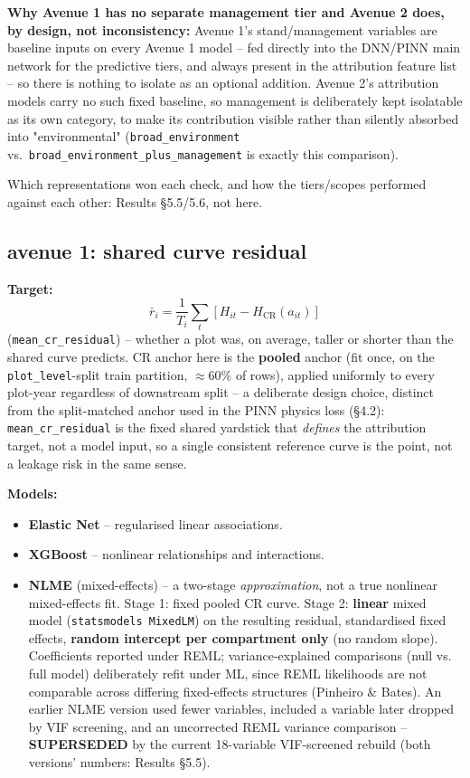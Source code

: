 \textbf{Why Avenue 1 has no separate management tier and Avenue 2 does, by design, not
inconsistency:} Avenue 1's stand/management variables are baseline inputs on every Avenue 1
model -- fed directly into the DNN/PINN main network for the predictive tiers, and always present
in the attribution feature list -- so there is nothing to isolate as an optional addition.
Avenue 2's attribution models carry no such fixed baseline, so management is deliberately kept
isolatable as its own category, to make its contribution visible rather than silently absorbed
into "environmental" (\texttt{broad\_environment} vs.\ \texttt{broad\_environment\_plus\_management}
is exactly this comparison).

Which representations won each check, and how the tiers/scopes performed against each other:
Results \S5.5/5.6, not here.

\subsection{avenue 1: shared curve residual}

\textbf{Target:}
\[
\bar r_i = \frac{1}{T_i}\sum_t \left[H_{it} - H_{\text{CR}}(a_{it})\right]
\]
(\texttt{mean\_cr\_residual}) -- whether a plot was, on average, taller or shorter than the shared
curve predicts. CR anchor here is the \textbf{pooled} anchor (fit once, on the
\texttt{plot\_level}-split train partition, $\approx$60\% of rows), applied uniformly to every
plot-year regardless of downstream split -- a deliberate design choice, distinct from the
split-matched anchor used in the PINN physics loss (\S4.2): \texttt{mean\_cr\_residual} is the
fixed shared yardstick that \emph{defines} the attribution target, not a model input, so a single
consistent reference curve is the point, not a leakage risk in the same sense.

\textbf{Models:}
\begin{itemize}
\setlength\itemsep{0pt}
\item \textbf{Elastic Net} -- regularised linear associations.
\item \textbf{XGBoost} -- nonlinear relationships and interactions.
\item \textbf{NLME} (mixed-effects) -- a two-stage \emph{approximation}, not a true nonlinear
mixed-effects fit. Stage 1: fixed pooled CR curve. Stage 2: \textbf{linear} mixed model
(\texttt{statsmodels MixedLM}) on the resulting residual, standardised fixed effects,
\textbf{random intercept per compartment only} (no random slope). Coefficients reported under
REML; variance-explained comparisons (null vs. full model) deliberately refit under ML, since REML
likelihoods are not comparable across differing fixed-effects structures (Pinheiro \& Bates). An
earlier NLME version used fewer variables, included a variable later dropped by VIF screening, and
an uncorrected REML variance comparison -- \textbf{SUPERSEDED} by the current 18-variable
VIF-screened rebuild (both versions' numbers: Results \S5.5).
\end{itemize}

